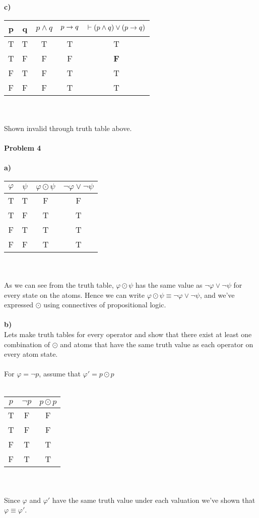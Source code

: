 \documentclass[12pt,oneside,reqno]{amsart}
\begin{document}
\textbf{c)}\\
	\begin{tabular}{ cc|c|c|c }
		p & q & $p \land q$ & $p \rightarrow{} q$ & $\vdash (p \land q) \lor (p \rightarrow{} q)$ \\ \hline
		T & T & 	T & T & T \\
		T & F & 	F & F & \textbf{F} \\
		F & T & 	F & T & T \\
		F & F & 	F & T & T \\
	\end{tabular}\\\\
	Shown invalid through truth table above.\\\\
\newpage
\textbf{Problem 4}\\\\
\textbf{a)}\\
	\begin{tabular}{ cc|c|c }
		$\varphi$ & $\psi$ & $\varphi \odot \psi$ & $\neg \varphi \lor \neg \psi$ \\ \hline
		T & T & 	F & F \\
		T & F & 	T & T \\
		F & T & 	T & T \\
		F & F & 	T & T \\
	\end{tabular}\\\\
As we can see from the truth table, $\varphi \odot \psi$ has the same value as $\neg \varphi \lor \neg \psi$ for every state on the atoms. Hence we can write $\varphi \odot \psi \equiv \neg \varphi \lor \neg \psi$, and we've expressed $\odot$ using connectives of propositional logic.\\\\

\textbf{b)}\\
Lets make truth tables for every operator and show that there exist at least one combination of $\odot$ and atoms that have the same truth value as each operator on every atom state.\\\\

For $\varphi = \neg p$, assume that $\varphi' = p \odot p$\\\\
	\begin{tabular}{ c|c|c }
		$p$ & $\neg p$ & $p \odot p$ \\ \hline
		T & 	F & F \\
		T & 	F & F \\
		F & 	T & T \\
		F &		T & T \\
	\end{tabular}\\\\
Since $\varphi$ and $\varphi'$ have the same truth value under each valuation we've shown that $\varphi \equiv \varphi'$.\\\\
\end{document}
